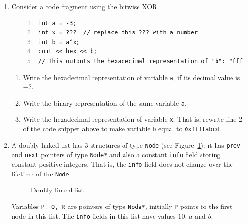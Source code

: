 \documentclass[a4paper,12pt]{article}
\begin{document}
\begin{enumerate}

\item 

Consider a code fragment using the bitwise XOR.

\begin{Verbatim}[frame=single,numbers=left]
int a = -3;
int x = ???  // replace this ??? with a number
int b = a^x;
cout << hex << b;
// This outputs the hexadecimal representation of "b": "ffffabcd".
\end{Verbatim}


\begin{enumerate}
\item Write the hexadecimal representation of variable \texttt{a}, if its decimal value is $-3$.
\item Write the binary representation of the same variable \texttt{a}.
\item Write the hexadecimal representation of variable \texttt{x}. That is, rewrite line 2 of the code snippet above to make variable \texttt{b} equal to {\tt 0xffffabcd}. 
\end{enumerate}

\vfill

\item 

A doubly linked list has 3 structures of type {\tt Node} (see Figure~\ref{fig:nodes}): 
it has {\tt prev} and {\tt next} pointers of type {\tt Node*} 
and also a constant {\tt info} field storing constant positive integers. That is, the {\tt info} field does not change over the lifetime of the \texttt{Node}. 

\begin{figure}[!htb]
\caption{\label{fig:nodes} Doubly linked list}
\end{figure}

Variables {\tt P, Q, R} are pointers of type {\tt Node*}, 
initially {\tt P} points to the first node in this list. 
The {\tt info} fields in this list have values $10$, $a$ and $b$. 


\end{enumerate}
\end{document}
